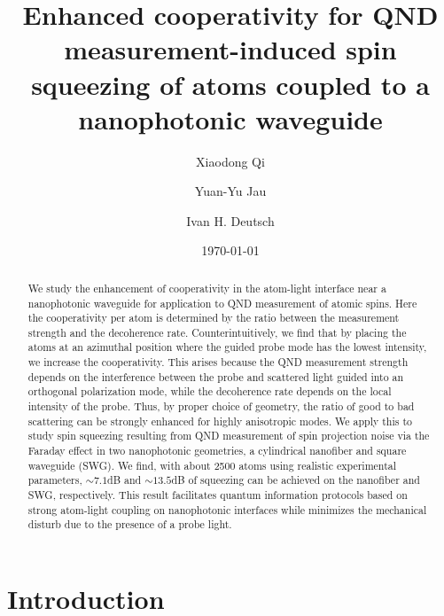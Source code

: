 \documentclass[aps,pra,twocolumn,superscriptaddress]{revtex4-1} %
\begin{document}
\title{Enhanced cooperativity for QND measurement-induced spin squeezing of atoms coupled to a nanophotonic waveguide}
\author{Xiaodong Qi}
\author{Yuan-Yu Jau}
\author{Ivan H. Deutsch}
\date{\today}

\begin{abstract}
We study the enhancement of cooperativity in the atom-light interface near a nanophotonic waveguide for application to QND measurement of atomic spins.  Here the cooperativity per atom is determined by the ratio between the  measurement strength and the decoherence rate.  Counterintuitively, we find that by placing the atoms at an azimuthal position where the guided probe mode has the lowest intensity, we increase the cooperativity.  This arises because the QND measurement strength depends on the interference between the probe and scattered light guided into an orthogonal polarization mode, while the decoherence rate depends on the local intensity of the probe.  Thus, by proper choice of geometry, the ratio of good to bad scattering can be strongly enhanced for highly anisotropic modes. We apply this to study spin squeezing resulting from QND measurement of spin projection noise via the Faraday effect in two nanophotonic geometries, a cylindrical nanofiber and square waveguide (SWG).  We find, with about 2500 atoms using realistic experimental parameters, $ \sim 7.1 $dB and $ \sim 13.5 $dB of squeezing can be achieved on the nanofiber and SWG, respectively. This result facilitates quantum information protocols based on strong atom-light coupling on nanophotonic interfaces while minimizes the mechanical disturb due to the presence of a probe light.
\end{abstract}

\maketitle

\section{Introduction}
\end{document}
